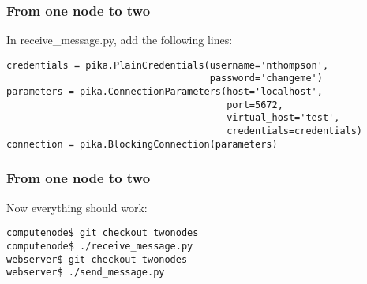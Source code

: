 \documentclass[9pt]{beamer}
\begin{document}
\begin{frame}[fragile]
  \frametitle{From one node to two}
  In receive\_message.py, add the following lines:
\begin{verbatim}
credentials = pika.PlainCredentials(username='nthompson',
                                    password='changeme')
parameters = pika.ConnectionParameters(host='localhost',
                                       port=5672,
                                       virtual_host='test',
                                       credentials=credentials)
connection = pika.BlockingConnection(parameters)
\end{verbatim}
\end{frame}

\begin{frame}[fragile]
\frametitle{From one node to two}
Now everything should work:
\begin{verbatim}
computenode$ git checkout twonodes
computenode$ ./receive_message.py
webserver$ git checkout twonodes
webserver$ ./send_message.py 
\end{verbatim}
\end{frame}
\end{document}
